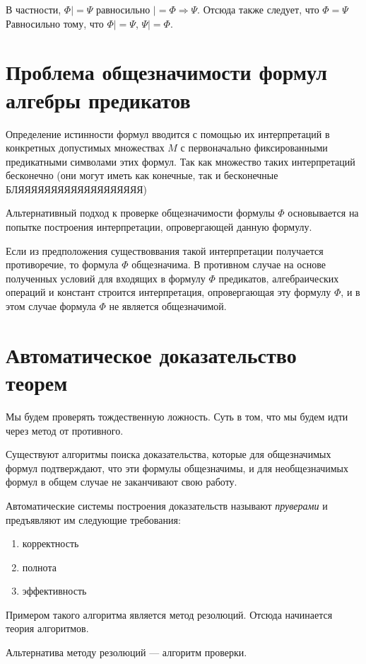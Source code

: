 В частности, $\Phi |= \Psi$ равносильно $|= \Phi \Rightarrow \Psi$. Отсюда также следует, что $\Phi = \Psi$ Равносильно тому, что $\Phi |= \Psi$, $\Psi |= \Phi$.

\section{Проблема общезначимости формул алгебры предикатов}
Определение истинности формул вводится с помощью их интерпретаций в конкретных допустимых множествах $M$ с первоначально фиксированными предикатными символами этих формул. Так как множество таких интерпретаций бесконечно (они могут иметь как конечные, так и бесконечные БЛЯЯЯЯЯЯЯЯЯЯЯЯЯЯЯЯЯЯЯ)

Альтернативный подход к проверке общезначимости формулы $\Phi$ основывается на попытке построения интерпретации, опровергающей данную формулу.

Если из предположения существоввания такой интерпретации получается противоречие, то формула $\Phi$ общезначима. В противном случае на основе полученных условий для входящих в формулу $\Phi$ предикатов, алгебраических операций и констант строится интерпретация, опровергающая эту формулу $\Phi$, и в этом случае формула $\Phi$ не является общезначимой.

\section{Автоматическое доказательство теорем}
Мы будем проверять тождественную ложность. Суть в том, что мы будем идти через метод от противного.

Существуют алгоритмы поиска доказательства, которые для общезначимых формул подтверждают, что эти формулы общезначимы, и для необщезначимых формул в общем случае не заканчивают свою работу.

Автоматические системы построения доказательств называют {\it пруверами} и предъявляют им следующие требования:
\begin{enumerate}
    \item корректность
    \item полнота 
    \item эффективность
\end{enumerate}

Примером такого алгоритма является метод резолюций. Отсюда начинается теория алгоритмов.

Альтернатива методу резолюций --- алгоритм проверки.


